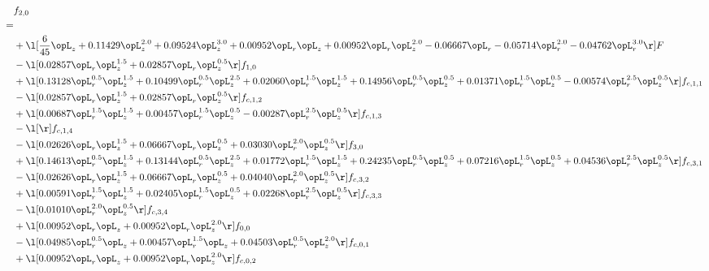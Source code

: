 \begin{alignat}{2} 
\label{eq:f_20_1} 
& f_{2,0} \nonumber \\ 
 = \\ 
& + \l[ \frac{6}{45} \opL_z +  0.11429 \opL_z^{2.0} +  0.09524 \opL_z^{3.0} +  0.00952 \opL_r \opL_z +  0.00952 \opL_r \opL_z^{2.0}   -0.06667 \opL_r   -0.05714 \opL_r^{2.0}   -0.04762 \opL_r^{3.0}  \r] F \nonumber \\ 
& - \l[  0.02857 \opL_r \opL_z^{1.5} +  0.02857 \opL_r \opL_z^{0.5}  \r] f_{1,0} \nonumber \\ 
& + \l[  0.13128 \opL_r^{0.5} \opL_z^{1.5} +  0.10499 \opL_r^{0.5} \opL_z^{2.5} +  0.02060 \opL_r^{1.5} \opL_z^{1.5} +  0.14956 \opL_r^{0.5} \opL_z^{0.5} +  0.01371 \opL_r^{1.5} \opL_z^{0.5}   -0.00574 \opL_r^{2.5} \opL_z^{0.5}  \r] f_{c,1,1} \nonumber \\ 
& - \l[  0.02857 \opL_r \opL_z^{1.5} +  0.02857 \opL_r \opL_z^{0.5}  \r] f_{c,1,2} \nonumber \\ 
& + \l[  0.00687 \opL_r^{1.5} \opL_z^{1.5} +  0.00457 \opL_r^{1.5} \opL_z^{0.5}   -0.00287 \opL_r^{2.5} \opL_z^{0.5}  \r] f_{c,1,3} \nonumber \\ 
& - \l[  \r] f_{c,1,4} \nonumber \\ 
& - \l[  0.02626 \opL_r \opL_z^{1.5} +  0.06667 \opL_r \opL_z^{0.5} +  0.03030 \opL_r^{2.0} \opL_z^{0.5}  \r] f_{3,0} \nonumber \\ 
& + \l[  0.14613 \opL_r^{0.5} \opL_z^{1.5} +  0.13144 \opL_r^{0.5} \opL_z^{2.5} +  0.01772 \opL_r^{1.5} \opL_z^{1.5} +  0.24235 \opL_r^{0.5} \opL_z^{0.5} +  0.07216 \opL_r^{1.5} \opL_z^{0.5} +  0.04536 \opL_r^{2.5} \opL_z^{0.5}  \r] f_{c,3,1} \nonumber \\ 
& - \l[  0.02626 \opL_r \opL_z^{1.5} +  0.06667 \opL_r \opL_z^{0.5} +  0.04040 \opL_r^{2.0} \opL_z^{0.5}  \r] f_{c,3,2} \nonumber \\ 
& + \l[  0.00591 \opL_r^{1.5} \opL_z^{1.5} +  0.02405 \opL_r^{1.5} \opL_z^{0.5} +  0.02268 \opL_r^{2.5} \opL_z^{0.5}  \r] f_{c,3,3} \nonumber \\ 
& - \l[  0.01010 \opL_r^{2.0} \opL_z^{0.5}  \r] f_{c,3,4} \nonumber \\ 
& + \l[  0.00952 \opL_r \opL_z +  0.00952 \opL_r \opL_z^{2.0}  \r] f_{0,0} \nonumber \\ 
& - \l[  0.04985 \opL_r^{0.5} \opL_z +  0.00457 \opL_r^{1.5} \opL_z +  0.04503 \opL_r^{0.5} \opL_z^{2.0}  \r] f_{c,0,1} \nonumber \\ 
& + \l[  0.00952 \opL_r \opL_z +  0.00952 \opL_r \opL_z^{2.0}  \r] f_{c,0,2} \nonumber \\ 

\end{alignat}

